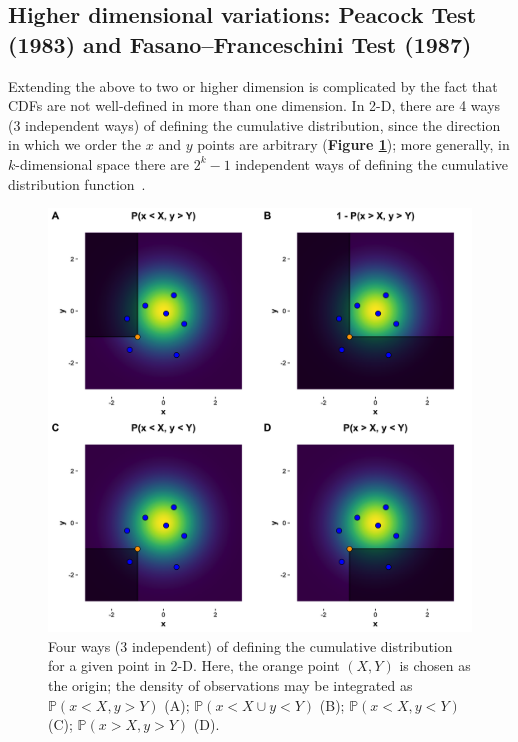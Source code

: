 \documentclass[codesnippet]{jss}
\begin{document}
\subsection{Higher dimensional variations: Peacock Test (1983) and Fasano--Franceschini Test (1987)}
Extending the above to two or higher dimension is complicated by the
fact that CDFs are not well-defined in more than one dimension.  In
2-D, there are 4 ways (3 independent ways) of defining the cumulative
distribution, since the direction in which we order the $x$ and $y$
points are arbitrary (\textbf{Figure \ref{fig:kstest2Dissue}}); more
generally, in $k$-dimensional space there are $2^{k}-1$ independent
ways of defining the cumulative distribution
function~\citep{Peacock1983}.

\begin{figure}[t!]
\centering
\includegraphics{CDF2Dissue}
\caption{\label{fig:kstest2Dissue} Four ways (3 independent) of defining the cumulative distribution for a given point in 2-D.  Here, the orange point $(X,Y)$ is chosen as the origin; the density of observations may be integrated as 
$\mathbb{P}(x < X, y > Y)$ (A); 
$\mathbb{P}(x < X \cup y < Y)$ (B); 
$\mathbb{P}(x < X, y < Y)$ (C); 
$\mathbb{P}(x > X, y > Y)$ (D). 
}
\end{figure}
\end{document}
